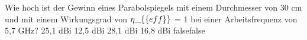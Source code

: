     {Wie hoch ist der Gewinn eines Parabolspiegels mit einem Durchmesser von 30 cm und mit einem Wirkungsgrad von $\eta\_\{\textrm\{eff\}\}$ = 1 bei einer Arbeitsfrequenz von 5,7 GHz?}
    {25,1 dBi}
    {12,5 dBi}
    {28,1 dBi}
    {16,8 dBi}
    {false}{false}